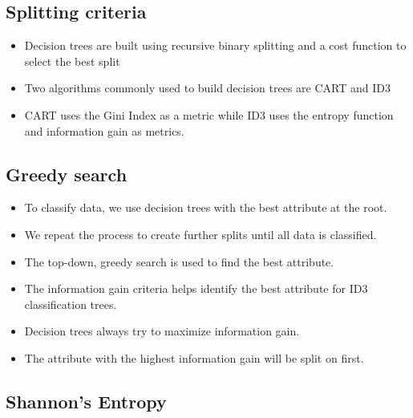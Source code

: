 \documentclass[11pt]{article}
\providecommand{\tightlist}{%
      \setlength{\itemsep}{0pt}\setlength{\parskip}{0pt}}
\begin{document}
\hypertarget{splitting-criteria}{%
\subsection{Splitting criteria}\label{splitting-criteria}}

\begin{itemize}
\tightlist
\item
  Decision trees are built using recursive binary splitting and a cost
  function to select the best split
\item
  Two algorithms commonly used to build decision trees are CART and ID3
\item
  CART uses the Gini Index as a metric while ID3 uses the entropy
  function and information gain as metrics.
\end{itemize}

\hypertarget{greedy-search}{%
\subsection{Greedy search}\label{greedy-search}}

\begin{itemize}
\tightlist
\item
  To classify data, we use decision trees with the best attribute at the
  root.
\item
  We repeat the process to create further splits until all data is
  classified.
\item
  The top-down, greedy search is used to find the best attribute.
\item
  The information gain criteria helps identify the best attribute for
  ID3 classification trees.
\item
  Decision trees always try to maximize information gain.
\item
  The attribute with the highest information gain will be split on
  first.
\end{itemize}

    \hypertarget{shannons-entropy}{%
\subsection{Shannon's Entropy}\label{shannons-entropy}}
\end{document}
